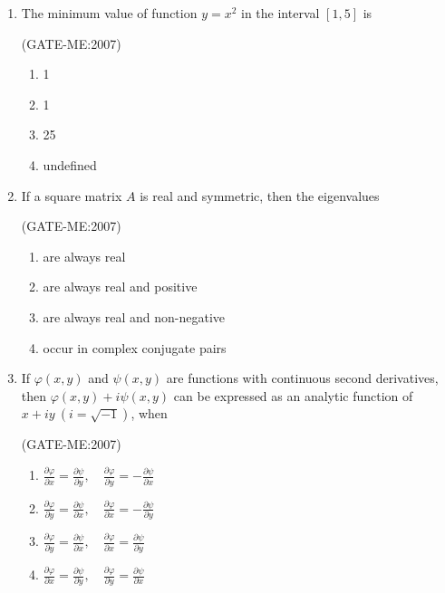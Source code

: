 \documentclass[journal,12pt,onecolumn]{IEEEtran}
\theoremstyle{remark}
\begin{document}
\begin{enumerate}
\item The minimum value of function $y = x^2$ in the interval $[1,5]$ is

	\hfill{(GATE-ME:2007)}
\begin{multicols}{4}
\begin{enumerate}
    \item 1
    \item 1
    \item 25
    \item undefined
\end{enumerate}
\end{multicols}

\item If a square matrix $A$ is real and symmetric, then the eigenvalues

	\hfill{(GATE-ME:2007)}

\begin{multicols}{2}
\begin{enumerate}
    \item are always real
    \item are always real and positive
    \item are always real and non-negative
    \item occur in complex conjugate pairs
\end{enumerate}
\end{multicols}

\item If $\varphi(x,y)$ and $\psi(x,y)$ are functions with continuous second derivatives, then $\varphi(x,y) + i \psi(x,y)$ can be expressed as an analytic function of $x + iy \ (i = \sqrt{-1})$, when

	\hfill{(GATE-ME:2007)}

\begin{multicols}{2}
\begin{enumerate}
    \item $\frac{\partial \varphi}{\partial x} = \frac{\partial \psi}{\partial y}, \quad \frac{\partial \varphi}{\partial y} = -\frac{\partial \psi}{\partial x}$
    \item $\frac{\partial \varphi}{\partial y} = \frac{\partial \psi}{\partial x}, \quad \frac{\partial \varphi}{\partial x} = -\frac{\partial \psi}{\partial y}$
    \item $\frac{\partial \varphi}{\partial y} = \frac{\partial \psi}{\partial x}, \quad \frac{\partial \varphi}{\partial x} = \frac{\partial \psi}{\partial y}$
    \item $\frac{\partial \varphi}{\partial x} = \frac{\partial \psi}{\partial y}, \quad \frac{\partial \varphi}{\partial y} = \frac{\partial \psi}{\partial x}$
\end{enumerate}
\end{multicols}


\end{enumerate}
\end{document}
